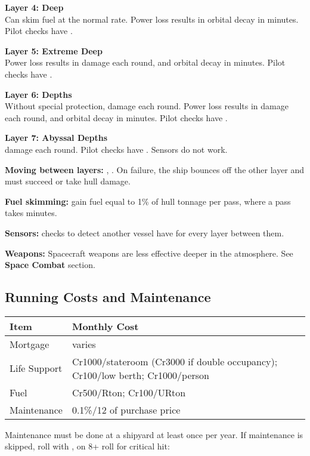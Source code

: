 \documentclass{cheatsheet}
\begin{document}
\begin{multicols}{3}
\textbf{Layer 4: Deep}\\
Can skim fuel at the normal rate.  Power loss results in orbital decay
in  minutes.  Pilot checks have .

\textbf{Layer 5: Extreme Deep}\\
Power loss results in  damage each round, and orbital decay
in  minutes.  Pilot checks have .

\textbf{Layer 6: Depths}\\
Without special protection,  damage each round.  Power loss
results in  damage each round, and orbital decay in 
minutes.  Pilot checks have .

\textbf{Layer 7: Abyssal Depths}\\
 damage each round.  Pilot checks have .  Sensors
do not work.

\textbf{Moving between layers:} ,
.  On failure, the ship bounces off the other
layer and must succeed  or
take  hull damage.

\textbf{Fuel skimming:} gain fuel equal to 1\% of hull tonnage per
pass, where a pass takes  minutes.

\textbf{Sensors:} checks to detect another vessel have  for
every layer between them.

\textbf{Weapons:} Spacecraft weapons are less effective deeper in the
atmosphere.  See \textbf{Space Combat} section.

\subsection{Running Costs and Maintenance}

\begin{tabularx}{\linewidth}{lX} \toprule
  Item & Monthly Cost \\ \midrule
  Mortgage & varies \\
  Life Support & Cr1000/stateroom (Cr3000 if double occupancy); Cr100/low berth; Cr1000/person \\
  Fuel & Cr500/Rton; Cr100/URton \\
  Maintenance & 0.1\%/12 of purchase price \\ \bottomrule
\end{tabularx}

Maintenance must be done at a shipyard at least once per year.  If
maintenance is skipped, roll with , on 8+ roll for
critical hit:


\end{multicols}
\end{document}
